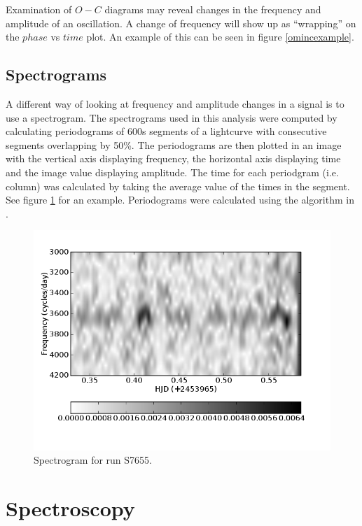 Examination of $O-C$ diagrams may reveal changes in the frequency and amplitude of an oscillation. A change of frequency will show up as ``wrapping'' on the $phase$ vs $time$ plot. An example of this can be seen in figure \ref{omincexample}.

\section{Spectrograms}
\label{spectrogram_section}
A different way of looking at frequency and amplitude changes in a signal is to use a spectrogram. The spectrograms used in this analysis were computed by calculating periodograms of 600s segments of a lightcurve with consecutive segments overlapping by 50\%. The periodograms are then plotted in an image with the vertical axis displaying frequency, the horizontal axis displaying time and the image value displaying amplitude. The time for each periodgram (i.e. column) was calculated by taking the average value of the times in the segment. See figure \ref{trailed_ft_example} for an example. Periodograms were calculated using the algorithm in \cite{kurtz_ft}.

\begin{figure}
 \centering
 \includegraphics[width = \columnwidth, bb=0 0 600 400]{images/spectrogram_example.png}
 \caption{Spectrogram for run S7655. }
 \label{trailed_ft_example}
\end{figure}


\chapter{Spectroscopy}

